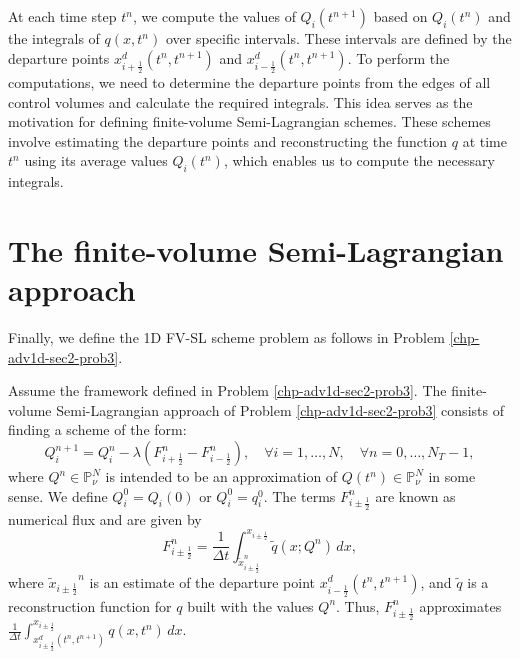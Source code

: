 At each time step $t^n$, we compute the values of ${Q}_i(t^{n+1})$ based on ${Q}_i(t^{n})$ and the integrals 
of $q(x, t^n)$ over specific intervals. These intervals are defined by the departure points 
$x_{i+\frac{1}{2}}^d(t^n,t^{n+1})$ and $x_{i-\frac{1}{2}}^d(t^n,t^{n+1})$.
To perform the computations, we need to determine the departure points from the edges of all control volumes
and calculate the required integrals. This idea serves as the motivation for defining finite-volume 
Semi-Lagrangian schemes. These schemes involve estimating the departure points and reconstructing the 
function $q$ at time $t^n$ using its average values $Q_i(t^n)$, which enables us to compute the necessary integrals.

\section{The finite-volume Semi-Lagrangian approach}
\label{chp-adv1d-sec2-fvsl}
Finally, we define the 1D FV-SL scheme problem as follows in Problem \ref{chp-adv1d-sec2-prob3}.
\begin{prob}[1D FV-SL scheme]
	\label{chp-adv1d-sec2-prob4}
	Assume the framework defined in Problem \ref{chp-adv1d-sec2-prob3}.
	The finite-volume Semi-Lagrangian approach of Problem \ref{chp-adv1d-sec2-prob3}
	consists of finding a scheme of the form:
	\begin{equation}
		\label{1d-fv-scheme}
		{Q}_{i}^{n+1} = {Q}_{i}^{n} -
		\lambda({F}_{i+\frac{1}{2}}^{n} - {F}_{i-\frac{1}{2}}^{n}),
		\quad \forall i = 1, \ldots, N,
		\quad \forall n = 0, \ldots, N_T-1,
	\end{equation}
	where ${Q}^{n} \in \mathbb{P}^{N}_{\nu}$ is intended to be an approximation
	of ${Q}(t^{n})\in \mathbb{P}^{N}_{\nu}$ in some sense. We define
	${Q}_{i}^{0} = {Q}_i(0)$ or ${Q}_{i}^{0} = {q}^{0}_{i}$.
	The terms ${F}_{i\pm\frac{1}{2}}^{n}$ are known as numerical flux and are given by
	\begin{equation}
		{F}_{i\pm\frac{1}{2}}^{n} =
		\frac{1}{\Delta t}
		\int_{\tilde{x}_{i\pm\frac{1}{2}}^n}^{x_{i\pm\frac{1}{2}}}\tilde{q}(x; Q^n) \,dx,
	\end{equation}
	where ${\tilde{x}_{i\pm\frac{1}{2}}}^n$ is an estimate of the departure point $x_{i-\frac{1}{2}}^d(t^n,t^{n+1})$,
	and $\tilde{q}$ is a reconstruction function for $q$ built with the values $Q^n$.
	Thus, ${F}_{i\pm\frac{1}{2}}^{n}$ approximates
	$\frac{1}{\Delta t} \int_{x_{i\pm\frac{1}{2}}^d(t^n,t^{n+1})}^{x_{i\pm \frac{1}{2}}}{q}(x, t^n) \,dx$.
\end{prob}
